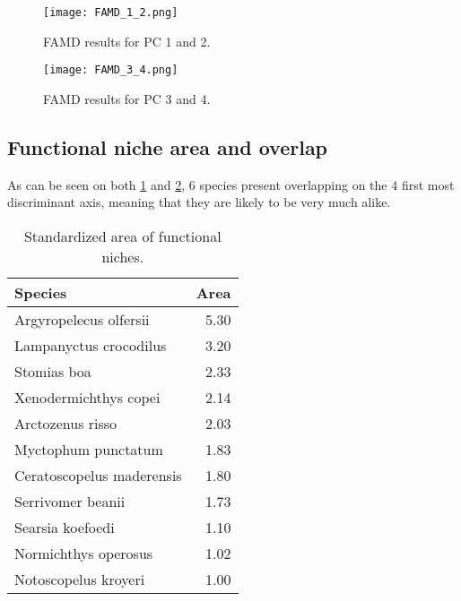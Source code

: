 \begin{figure} [!htbp]
	\begin{center}
		\texttt{[image: FAMD\_1\_2.png]}
	\end{center}
	\caption{FAMD results for PC 1 and 2.}
	\label{fig:famd12}
\end{figure}

\begin{figure} [!htbp]
	\begin{center}
		\texttt{[image: FAMD\_3\_4.png]}
	\end{center}
	\caption{FAMD results for PC 3 and 4.}
	\label{fig:famd34}
\end{figure}


\subsection{Functional niche area and overlap}

As can be seen on both \ref{fig:famd12} and \ref{fig:famd34}, 6 species present overlapping on the 4 first most discriminant axis, meaning that they are likely to be very much alike. 

\begin{table}[ht]
\centering
\label{table:sp_area}
\caption{Standardized area of functional niches.}
\begin{adjustbox}{max width=1.1\textwidth,center}
\begin{tabular}{lr}
  \hline
Species & Area \\ 
  \hline
Argyropelecus olfersii & 5.30 \\ 
  Lampanyctus crocodilus & 3.20 \\ 
  Stomias boa & 2.33 \\ 
  Xenodermichthys copei & 2.14 \\ 
  Arctozenus risso & 2.03 \\ 
  Myctophum punctatum & 1.83 \\ 
  Ceratoscopelus maderensis & 1.80 \\ 
  Serrivomer beanii & 1.73 \\ 
  Searsia koefoedi & 1.10 \\ 
  Normichthys operosus & 1.02 \\ 
  Notoscopelus kroyeri & 1.00 \\ 
   \hline
\end{tabular}
\end{adjustbox}
\end{table}


